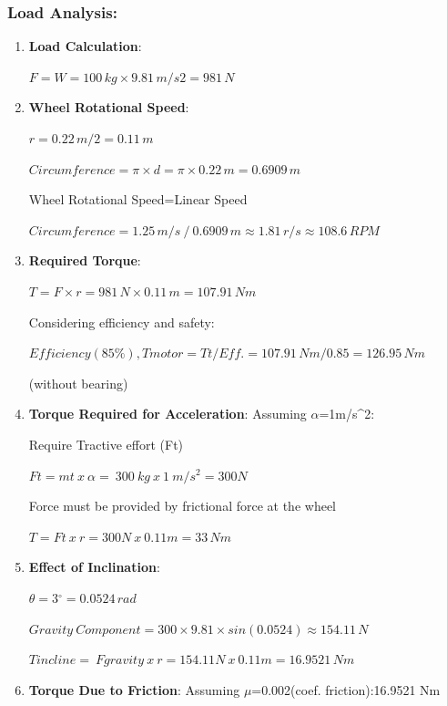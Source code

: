 \documentclass[../../main]{subfiles}
\begin{document}
\subsubsection{Load Analysis:}
\begin{enumerate}
\def\labelenumi{\arabic{enumi}.}
\item
  \textbf{Load Calculation}:
  
  \(F = W = 100\, kg \times 9.81\, m/s2 = 981\, N\)
  
  \item
  \textbf{Wheel Rotational Speed}:
  
  \(r = 0.22\, m/2 = 0.11\, m\)
  
  \(Circumference = \pi \times d = \pi \times 0.22\, m = 0.6909\, m\)
  
  Wheel Rotational Speed=Linear Speed
  
  \(Circumference = 1.25\, m/s\ /\ 0.6909\, m \approx 1.81\, r/s \approx 108.6\, RPM\)
  

\item
  \textbf{Required Torque}:

\(T = F \times r = 981\, N \times 0.11\, m = 107.91\, Nm\)

Considering efficiency and safety:

\(Efficiency(85\%),Tmotor = Tt/Eff. = 107.91\, Nm/0.85 = 126.95\, Nm\)

(without bearing)
\item
\textbf{Torque Required for Acceleration}: Assuming $\alpha$=1m/s\^{}2:

Require Tractive effort (Ft)

\(Ft = mt\ x\ \alpha = \ 300\ kg\ x\ 1\ m/s^{2} = 300N\)

Force must be provided by frictional force at the wheel

\(T = Ft\ x\ r = 300N\ x\ 0.11m = 33\, Nm\)

\item
  \textbf{Effect of Inclination}:

\(\theta = 3{^\circ} = 0.0524\, rad\)

\(Gravity\ Component = 300 \times 9.81 \times sin(0.0524) \approx 154.11\, N\)

\(Tincline = \ Fgravity\ x\ r = 154.11N\ x\ 0.11m = 16.9521\, Nm\,\)

\item
  \textbf{Torque Due to Friction}: Assuming $\mu$=0.002(coef.
  friction):16.9521 Nm
\end{enumerate}
\end{document}
